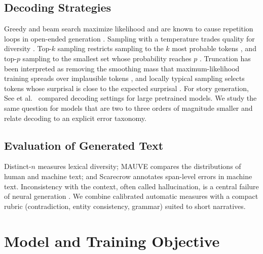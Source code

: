 \documentclass[journal]{IEEEtran}
\begin{document}
\subsection{Decoding Strategies}
Greedy and beam search maximize likelihood and are known to cause repetition loops in open-ended generation \cite{holtzman2020curious,welleck2020unlikelihood}. Sampling with a temperature trades quality for diversity \cite{zhang2021tradeoff}. Top-$k$ sampling restricts sampling to the $k$ most probable tokens \cite{fan2018hierarchical}, and top-$p$ sampling to the smallest set whose probability reaches $p$ \cite{holtzman2020curious}. Truncation has been interpreted as removing the smoothing mass that maximum-likelihood training spreads over implausible tokens \cite{hewitt2022truncation}, and locally typical sampling selects tokens whose surprisal is close to the expected surprisal \cite{meister2023typical}. For story generation, See et al.\ \cite{see2019storytellers} compared decoding settings for large pretrained models. We study the same question for models that are two to three orders of magnitude smaller and relate decoding to an explicit error taxonomy.

\subsection{Evaluation of Generated Text}
Distinct-$n$ \cite{li2016diversity} measures lexical diversity; MAUVE \cite{pillutla2021mauve} compares the distributions of human and machine text; and Scarecrow \cite{dou2022scarecrow} annotates span-level errors in machine text. Inconsistency with the context, often called hallucination, is a central failure of neural generation \cite{maynez2020faithfulness,ji2023hallucination}. We combine calibrated automatic measures with a compact rubric (contradiction, entity consistency, grammar) suited to short narratives.

\section{Model and Training Objective}
\label{sec:model}
\end{document}
